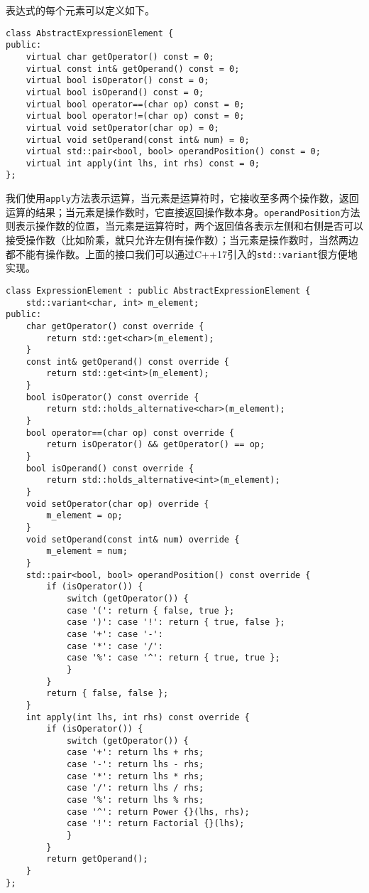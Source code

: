 表达式的每个元素可以定义如下。

\begin{lstlisting}
class AbstractExpressionElement {
public:
    virtual char getOperator() const = 0;
    virtual const int& getOperand() const = 0;
    virtual bool isOperator() const = 0;
    virtual bool isOperand() const = 0;
    virtual bool operator==(char op) const = 0;
    virtual bool operator!=(char op) const = 0;
    virtual void setOperator(char op) = 0;
    virtual void setOperand(const int& num) = 0;
    virtual std::pair<bool, bool> operandPosition() const = 0;
    virtual int apply(int lhs, int rhs) const = 0;
};
\end{lstlisting}

我们使用\lstinline{apply}方法表示运算，当元素是运算符时，它接收至多两个操作数，返回运算的结果；当元素是操作数时，它直接返回操作数本身。\lstinline{operandPosition}方法则表示操作数的位置，当元素是运算符时，两个返回值各表示左侧和右侧是否可以接受操作数（比如阶乘，就只允许左侧有操作数）；当元素是操作数时，当然两边都不能有操作数。上面的接口我们可以通过C++17引入的\lstinline{std::variant}很方便地实现。

\begin{lstlisting}
class ExpressionElement : public AbstractExpressionElement {
    std::variant<char, int> m_element;
public:
    char getOperator() const override {
        return std::get<char>(m_element);
    }
    const int& getOperand() const override {
        return std::get<int>(m_element);
    }
    bool isOperator() const override {
        return std::holds_alternative<char>(m_element);
    }
    bool operator==(char op) const override {
        return isOperator() && getOperator() == op;
    }
    bool isOperand() const override {
        return std::holds_alternative<int>(m_element);
    }
    void setOperator(char op) override {
        m_element = op;
    }
    void setOperand(const int& num) override {
        m_element = num;
    }
    std::pair<bool, bool> operandPosition() const override {
        if (isOperator()) {
            switch (getOperator()) {
            case '(': return { false, true };
            case ')': case '!': return { true, false };
            case '+': case '-': 
            case '*': case '/':
            case '%': case '^': return { true, true };
            }
        }
        return { false, false };
    }
    int apply(int lhs, int rhs) const override {
        if (isOperator()) {
            switch (getOperator()) {
            case '+': return lhs + rhs;
            case '-': return lhs - rhs;
            case '*': return lhs * rhs;
            case '/': return lhs / rhs;
            case '%': return lhs % rhs;
            case '^': return Power {}(lhs, rhs);
            case '!': return Factorial {}(lhs);
            }
        }
        return getOperand();
    }
};
\end{lstlisting}

